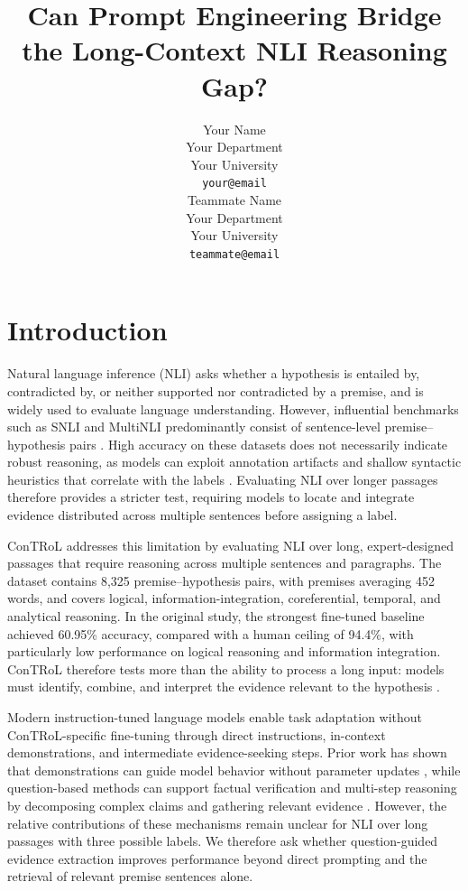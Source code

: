 \documentclass[11pt]{article}
\title{Can Prompt Engineering Bridge the Long-Context NLI Reasoning Gap?}
\author{
  Your Name \\
  Your Department \\
  Your University \\
  \texttt{your@email} \\
  \And
  Teammate Name \\
  Your Department \\
  Your University \\
  \texttt{teammate@email} \\
}
\begin{document}
\maketitle

\begin{abstract}
\end{abstract}

\section{Introduction}

Natural language inference (NLI) asks whether a hypothesis is entailed by,
contradicted by, or neither supported nor contradicted by a premise, and is
widely used to evaluate language understanding. However, influential
benchmarks such as SNLI and MultiNLI predominantly consist of sentence-level
premise--hypothesis pairs \citep{bowman-etal-2015-large,williams-etal-2018-broad}.
High accuracy on these datasets does not necessarily indicate robust
reasoning, as models can exploit annotation artifacts and shallow syntactic
heuristics that correlate with the labels
\citep{gururangan-etal-2018-annotation,mccoy-etal-2019-right}. Evaluating NLI
over longer passages therefore provides a stricter test, requiring models to
locate and integrate evidence distributed across multiple sentences before
assigning a label.

ConTRoL addresses this limitation by evaluating NLI over long, expert-designed
passages that require reasoning across multiple sentences and paragraphs. The
dataset contains 8,325 premise--hypothesis pairs, with premises averaging 452
words, and covers logical, information-integration, coreferential, temporal,
and analytical reasoning. In the original study, the strongest fine-tuned
baseline achieved 60.95\% accuracy, compared with a human ceiling of 94.4\%,
with particularly low performance on logical reasoning and information
integration. ConTRoL therefore tests more than the ability to process a long
input: models must identify, combine, and interpret the evidence relevant to
the hypothesis \citep{liu-etal-2021-natural}.

Modern instruction-tuned language models enable task adaptation without
ConTRoL-specific fine-tuning through direct instructions, in-context
demonstrations, and intermediate evidence-seeking steps. Prior work has shown
that demonstrations can guide model behavior without parameter updates
\citep{brown2020language}, while question-based methods can support factual
verification and multi-step reasoning by decomposing complex claims and
gathering relevant evidence \citep{wang-etal-2020-asking,min-etal-2019-multi}.
However, the relative contributions of these mechanisms remain unclear for
NLI over long passages with three possible labels. We therefore ask whether
question-guided evidence extraction improves performance beyond direct
prompting and the retrieval of relevant premise sentences alone.
\end{document}
